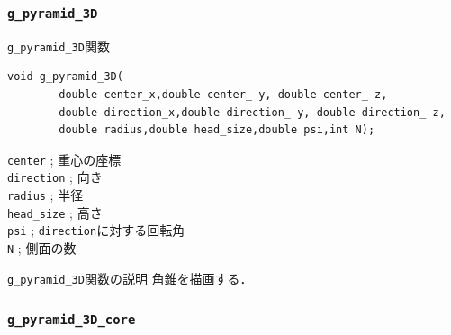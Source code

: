 \documentclass[a4paper,12pt]{jsarticle}%
\begin{document}
\clearpage
\subsubsection{\texttt{g\_pyramid\_3D}}

\begin{itembox}[l]{\texttt{g\_pyramid\_3D}関数}
\begin{verbatim}
void g_pyramid_3D(
        double center_x,double center_ y, double center_ z,
        double direction_x,double direction_ y, double direction_ z,
        double radius,double head_size,double psi,int N);
\end{verbatim}
\verb|center| ; 重心の座標\\
\verb|direction| ; 向き\\
\verb|radius| ; 半径\\
\verb|head_size| ; 高さ\\
\verb|psi| ; \verb|direction|に対する回転角\\
\verb|N| ; 側面の数\\
\end{itembox}

\begin{itembox}[l]{\texttt{g\_pyramid\_3D}関数の説明}
角錐を描画する．
\end{itembox}



\clearpage
\subsubsection{\texttt{g\_pyramid\_3D\_core}}
\end{document}
